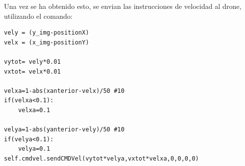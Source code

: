 \hspace{1 cm} Una vez se ha obtenido esto, se envian las instrucciones de velocidad al drone, utilizando el comando:
\begin{lstlisting}[backgroundcolor=\color{yellow}]
vely = (y_img-positionX)                        
velx = (x_img-positionY)

vytot= vely*0.01 
vxtot= velx*0.01

velxa=1-abs(xanterior-velx)/50 #10
if(velxa<0.1):    
    velxa=0.1

velya=1-abs(yanterior-vely)/50 #10
if(velya<0.1):
    velya=0.1
self.cmdvel.sendCMDVel(vytot*velya,vxtot*velxa,0,0,0,0) 
\end{lstlisting}
	






